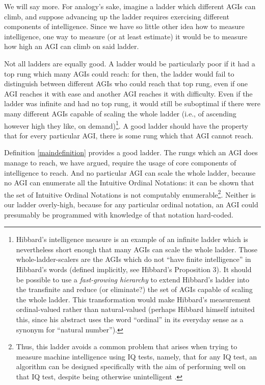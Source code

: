 \documentclass[runningheads]{llncs}
\begin{document}
We will say more.
For analogy's sake, imagine a ladder which different AGIs
can climb, and suppose advancing up the ladder requires exercising different
components of intelligence. Since we have so little other idea how to measure
intelligence, one way to measure (or at least estimate) it would be
to measure how high an AGI can climb on said ladder.

Not all ladders are equally good. A ladder would be particularly poor if it had
a top rung which many AGIs could reach: for then, the ladder would fail to
distinguish between different AGIs who could reach that top rung, even if one
AGI reaches it with ease and another AGI reaches it with difficulty.
Even if the ladder was infinite and had no top rung, it would still be suboptimal
if there were many different AGIs capable of scaling the whole
ladder (i.e., of ascending however high they like, on demand)\footnote{Hibbard's
intelligence measure
\cite{hibbard2011measuring} is an example of an infinite ladder
which is nevertheless short enough that many AGIs can
scale the whole ladder. Those whole-ladder-scalers are the AGIs which
do not ``have finite intelligence'' in Hibbard's words
(defined implicitly, see Hibbard's Proposition 3). It should be possible to
use a \emph{fast-growing hierarchy}
\cite{fairtlough1998hierarchies} \cite{weiermann2002slow}
to extend Hibbard's ladder into the transfinite and reduce (or eliminate?)
the set of AGIs capable of scaling the whole ladder. This transformation would make
Hibbard's measurement ordinal-valued rather than natural-valued
(perhaps Hibbard himself intuited this, since his abstract uses the
word ``ordinal''
in its everyday sense as a synonym for ``natural number'').}.
A good ladder
should have the property that for every particular AGI, there is some rung which
that AGI cannot reach.

Definition \ref{maindefinition} provides a good ladder.
The rungs which an AGI does
manage to reach, we have argued, require the usage of core components of intelligence
to reach.
And no particular AGI can scale
the whole ladder,
because no AGI can enumerate all the Intuitive Ordinal Notations: it can
be shown
that the set of Intuitive Ordinal Notations is not computably enumerable\footnote{Thus,
this ladder avoids a common problem that arises when
trying to measure machine intelligence using IQ tests, namely, that for any IQ test,
an algorithm can be designed specifically with the aim of performing well on that
IQ test, despite being otherwise unintelligent \cite{besold2015can}.}.
Neither is our ladder overly-high, because for any particular
ordinal notation, an AGI could presumably be programmed with knowledge of that notation
hard-coded.
\end{document}
